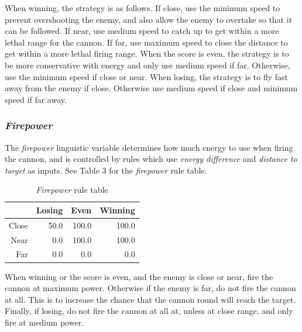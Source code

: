 When winning, the strategy is as follows. If close, use the minimum speed to prevent overshooting the enemy, and also allow the enemy to overtake so that it can be followed. If near, use medium speed to catch up to get within a more lethal range for the cannon. If far, use maximum speed to close the distance to get within a more lethal firing range. When the score is even, the strategy is to be more conservative with energy and only use medium speed if far. Otherwise, use the minimum speed if close or near. When losing, the strategy is to fly fast away from the enemy if close. Otherwise use medium speed if close and minimum speed if far away.

\subsubsection{\emph{Firepower}}

The \emph{firepower} linguistic variable determines how much energy to use when firing the cannon, and is controlled by rules which use \emph{energy difference} and \emph{distance to target} as inputs. See Table 3 for the \emph{firepower} rule table.

\begin{table}[H]
\centering
\caption{\emph{Firepower} rule table}
\label{Firepower rule table}
\begin{tabular}{r|r|r|r}
 		& Losing 	& Even 		& Winning	\\ \hline
Close	& 50.0		& 100.0 	& 100.0		\\
Near	& 0.0 		& 100.0 	& 100.0		\\
Far		& 0.0 		& 0.0 		& 0.0		\\
\end{tabular}
\end{table}

When winning or the score is even, and the enemy is close or near, fire the cannon at maximum power. Otherwise if the enemy is far, do not fire the cannon at all. This is to increase the chance that the cannon round will reach the target. Finally, if losing, do not fire the cannon at all at, unless at close range, and only fire at medium power.
